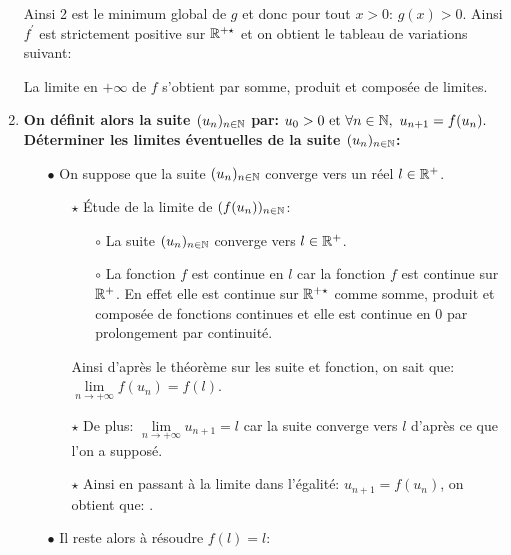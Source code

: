 \documentclass[a4paper, 11pt,reqno]{article}
\begin{document}
\begin{correction}
\begin{enumerate}
\begin{center}
		      \end{center}
		      Ainsi 2 est le minimum global de $g$ et donc pour tout $x>0$: $g(x)>0$. Ainsi $f^{\prime}$ est strictement positive sur $\mathbb{R}^{+\star}$ et on obtient le tableau de variations suivant:
		      \begin{center}
		      \end{center}
		      La limite en $+\infty$ de $f$ s'obtient par somme, produit et compos\'ee de limites.
		\item \textbf{On d\'efinit alors la suite $(u_n)_{n\in \mathbb{N}}$ par: $u_0>0\ \hbox{et}\ \forall n\in\N,\ u_{n+1}=f(u_n).$}
		      \textbf{D\'eterminer les limites \'eventuelles de la suite $(u_n)_{n\in \mathbb{N}}$:}
		      \begin{itemize}
			      \item[$\bullet$] On suppose que la suite $(u_n)_{n\in \mathbb{N}}$ converge vers un r\'eel $l\in\mathbb{R}^+$.
			            \begin{itemize}
				            \item[$\star$] \'Etude de la limite de $(f(u_n))_{n\in\mathbb{N}}$:
				                  \begin{itemize}
					                  \item[$\circ$] La suite $(u_n)_{n\in \mathbb{N}}$ converge vers $l\in\mathbb{R}^+$.
					                  \item[$\circ$] La fonction $f$ est continue en $l$ car la fonction $f$ est continue sur $\mathbb{R}^+$. En effet elle est continue sur $\mathbb{R}^{+\star}$ comme somme, produit et compos\'ee de fonctions continues et elle est continue en 0 par prolongement par continuit\'e.
				                  \end{itemize}
				                  Ainsi d'apr\`{e}s le th\'eor\`{e}me sur les suite et fonction, on sait que: $\lim\limits_{n\to +\infty} f(u_n)=f(l)$.
				            \item[$\star$] De plus: $\lim\limits_{n\to +\infty} u_{n+1}=l$ car la suite converge vers $l$ d'apr\`{e}s ce que l'on a suppos\'e.
				            \item[$\star$] Ainsi en passant \`{a} la limite dans l'\'egalit\'e: $u_{n+1}=f(u_n)$, on obtient que: .
			            \end{itemize}
			      \item[$\bullet$] Il reste alors \`{a} r\'esoudre $f(l)=l$:

\end{itemize}
\end{enumerate}
\end{correction}
\end{document}
